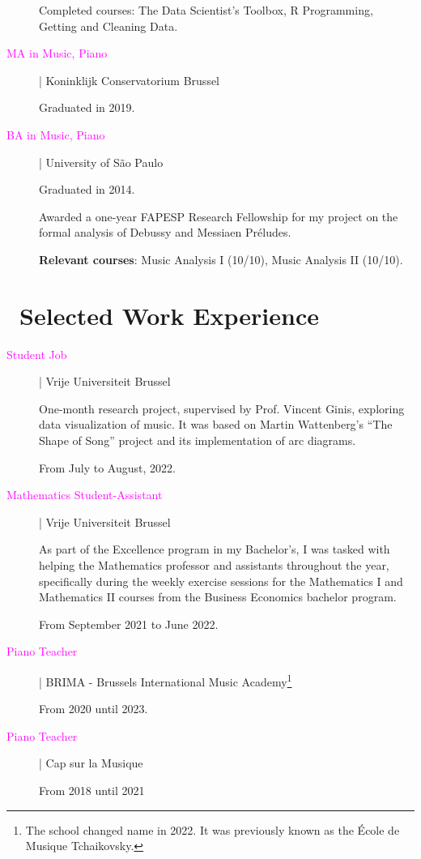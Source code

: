 \documentclass[12pt]{article}
\begin{document}
\begin{description}
Completed courses: The Data Scientist’s Toolbox, R Programming, Getting and Cleaning Data.  

\item[\textcolor{Fuchsia}{MA in Music, Piano}] | Koninklijk Conservatorium Brussel

Graduated in 2019.

\item[\textcolor{Fuchsia}{BA in Music, Piano}] | University of São Paulo

Graduated in 2014.

Awarded a one-year FAPESP Research Fellowship for my project on the formal analysis of Debussy and Messiaen Préludes.

\textbf{Relevant courses}: Music Analysis I (10/10), Music Analysis II (10/10).

\end{description}

\section*{\textcolor{Fuchsia}\faToolbox\ Selected Work Experience}
\begin{description} 
\item[\textcolor{Fuchsia}{Student Job}] | Vrije Universiteit Brussel

One-month research project, supervised by Prof. Vincent Ginis, exploring data visualization of music. It was based on Martin Wattenberg’s “The Shape of Song” project and its implementation of arc diagrams.
  
From July to August, 2022.

\item[\textcolor{Fuchsia}{Mathematics Student-Assistant}] | Vrije Universiteit Brussel

As part of the Excellence program in my Bachelor’s, I was tasked with helping the Mathematics professor and assistants throughout the year, specifically during the weekly exercise sessions for the Mathematics I and Mathematics II courses from the Business Economics bachelor program.
  
From September 2021 to June 2022.
\\
\item[\textcolor{Fuchsia}{Piano Teacher}] | BRIMA - Brussels International Music Academy\footnote{The school changed name in 2022. It was previously known as the École de Musique Tchaikovsky.}
  
From 2020 until 2023.

\item[\textcolor{Fuchsia}{Piano Teacher}] | Cap sur la Musique

From 2018 until 2021

\end{description}
\end{document}
